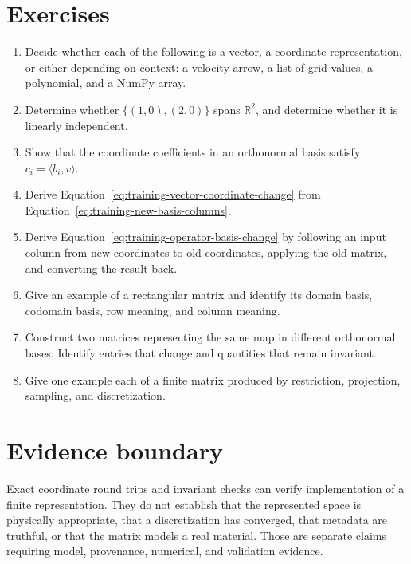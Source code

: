 \section{Exercises}

\begin{enumerate}
  \item Decide whether each of the following is a vector, a coordinate
        representation, or either depending on context: a velocity arrow, a
        list of grid values, a polynomial, and a NumPy array.
  \item Determine whether
        \(\{(1,0),(2,0)\}\) spans \(\mathbb R^2\), and determine whether it is
        linearly independent.
  \item Show that the coordinate coefficients in an orthonormal basis satisfy
        \(c_i=\langle b_i,v\rangle\).
  \item Derive Equation~\eqref{eq:training-vector-coordinate-change} from
        Equation~\eqref{eq:training-new-basis-columns}.
  \item Derive Equation~\eqref{eq:training-operator-basis-change} by following
        an input column from new coordinates to old coordinates, applying the
        old matrix, and converting the result back.
  \item Give an example of a rectangular matrix and identify its domain basis,
        codomain basis, row meaning, and column meaning.
  \item Construct two matrices representing the same map in different
        orthonormal bases. Identify entries that change and quantities that
        remain invariant.
  \item Give one example each of a finite matrix produced by restriction,
        projection, sampling, and discretization.
\end{enumerate}

\section{Evidence boundary}

Exact coordinate round trips and invariant checks can verify implementation of
a finite representation. They do not establish that the represented space is
physically appropriate, that a discretization has converged, that metadata are
truthful, or that the matrix models a real material. Those are separate claims
requiring model, provenance, numerical, and validation evidence.
